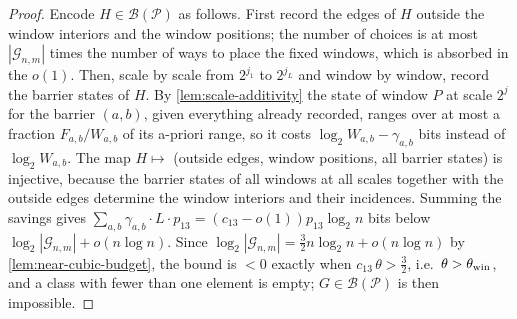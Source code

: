 \documentclass[11pt]{article}
\begin{document}
\begin{proof}
Encode \(H\in\mathcal B(\mathcal P)\) as follows.  First record the edges of
\(H\) outside the window interiors and the window positions; the number of
choices is at most \(|\mathcal G_{n,m}|\) times the number of ways to place the
fixed windows, which is absorbed in the \(o(1)\).  Then, scale by scale from
\(2^{j_1}\) to \(2^{j_L}\) and window by window, record the barrier states of
\(H\).  By \cref{lem:scale-additivity} the state of window \(P\) at scale
\(2^j\) for the barrier \((a,b)\), given everything already recorded, ranges
over at most a fraction \(F_{a,b}/W_{a,b}\) of its a-priori range, so it costs
\(\log_2 W_{a,b}-\gamma_{a,b}\) bits instead of \(\log_2 W_{a,b}\).  The map
\(H\mapsto\) (outside edges, window positions, all barrier states) is injective,
because the barrier states of all windows at all scales together with the
outside edges determine the window interiors and their incidences.  Summing the
savings gives \(\sum_{a,b}\gamma_{a,b}\cdot L\cdot p_{13}=(c_{13}-o(1))p_{13}\log_2 n\)
bits below \(\log_2|\mathcal G_{n,m}|+o(n\log n)\).  Since
\(\log_2|\mathcal G_{n,m}|=\tfrac32 n\log_2 n+o(n\log n)\) by
\cref{lem:near-cubic-budget}, the bound is \(<0\) exactly when
\(c_{13}\,\theta>\tfrac32\), i.e.\ \(\theta>\theta_{\rm win}\), and a class with
fewer than one element is empty; \(G\in\mathcal B(\mathcal P)\) is then
impossible.
\end{proof}
\end{document}

